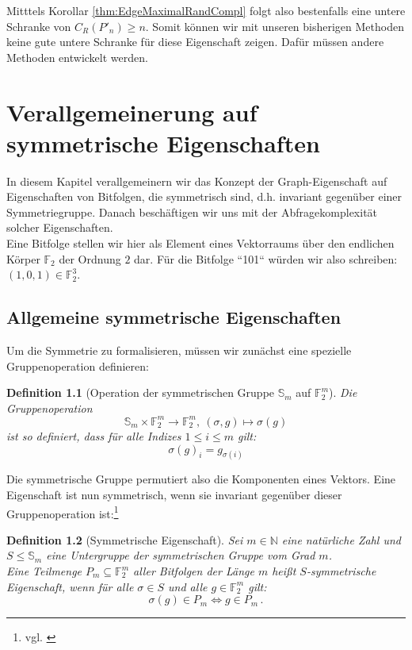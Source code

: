 \documentclass[10pt,a4paper, footheight=1mm]{scrreprt}
\newtheorem{definition}{Definition}
\theoremstyle{definition}
\begin{document}
Mitttels Korollar \ref{thm:EdgeMaximalRandCompl} folgt also bestenfalls
eine untere Schranke von $C_R(P'_n) \geq n$. Somit können
wir mit unseren bisherigen Methoden keine gute untere Schranke
für diese Eigenschaft zeigen. Dafür müssen andere Methoden
entwickelt werden.

\chapter{Verallgemeinerung auf symmetrische Eigenschaften}
In diesem Kapitel verallgemeinern wir das Konzept der
Graph-Eigenschaft auf Eigenschaften von Bitfolgen, die
symmetrisch sind, d.h. invariant gegenüber einer Symmetriegruppe.
Danach beschäftigen wir uns mit der Abfragekomplexität
solcher Eigenschaften. \\
Eine Bitfolge stellen wir hier als Element eines Vektorraums
über den endlichen Körper $\mathbb{F}_2$ der Ordnung $2$ dar.
Für die Bitfolge ``101`` würden wir also schreiben:
$ (1,0,1) \in \mathbb{F}_2^3$.

\section{Allgemeine symmetrische Eigenschaften}
Um die Symmetrie zu formalisieren, müssen wir zunächst
eine spezielle Gruppenoperation definieren:

\begin{definition}
[Operation der symmetrischen Gruppe $\mathbb{S}_m$ auf $\mathbb{F}_2^m$]
Die Gruppenoperation
$$\mathbb{S}_m \times \mathbb{F}_2^m \to \mathbb{F}_2^m, 
  \ (\sigma,g) \mapsto \sigma(g)$$
ist so definiert, dass für alle Indizes $1\leq i \leq m$ gilt:
$$ \sigma(g)_i = g_{\sigma(i)} $$
\end{definition}
Die symmetrische Gruppe permutiert also die Komponenten eines
Vektors. Eine Eigenschaft ist nun symmetrisch, wenn sie invariant
gegenüber dieser Gruppenoperation ist:\footnote{vgl. \cite[S.7]{Rivest}}

\begin{definition}[Symmetrische Eigenschaft]
Sei $m\in \mathbb{N}$ eine natürliche Zahl und
$S \leq \mathbb{S}_m$ eine Untergruppe der 
symmetrischen Gruppe vom Grad $m$. \\
Eine Teilmenge
$P_m \subseteq \mathbb{F}_2^m$ aller Bitfolgen der
Länge $m$ heißt \emph{$S$-symmetrische Eigenschaft}, wenn
für alle $\sigma \in S$ und alle $g\in \mathbb{F}_2^m$ gilt:
$$ \sigma(g)\in P_m \iff g \in P_m\,.$$ 
\end{definition}
\end{document}
